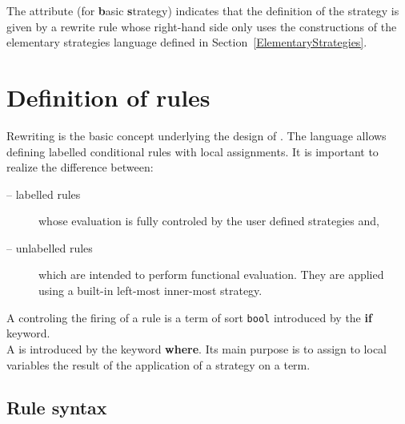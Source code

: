 



The  attribute (for {\bf b}asic {\bf s}trategy) indicates that
the definition of the strategy is given by a rewrite rule whose
right-hand side only uses the constructions of the elementary
strategies language defined in Section~\ref{ElementaryStrategies}.


\section{Definition of rules}
\label{Definition of rules}

Rewriting is the basic concept underlying the design of \elan. The
language allows defining labelled conditional rules with local
assignments. 
It is important to realize the difference between:
\begin{description}
\item[-- labelled rules] whose evaluation is fully controled by the user
  defined strategies and,
\item[-- unlabelled rules] which are intended to perform functional
evaluation.  
They are applied using a built-in left-most inner-most strategy.

\end{description}
A  controling the firing of a rule is a term of sort
{\tt bool} introduced by the {\bf if} keyword.\\ A
 is introduced by the keyword {\bf where}. Its
main purpose is to assign to local variables the result of the
application of a strategy on a term.

\subsection{Rule syntax}
\label{Rule syntax}

